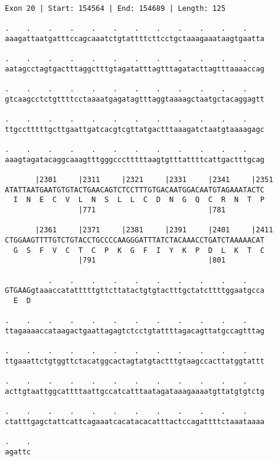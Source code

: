 \documentclass{article}
\begin{document}
\begin{Verbatim}[fontfamily=courier]
Exon 20 | Start: 154564 | End: 154689 | Length: 125

.    .    .    .    .    .    .    .    .    .    .    .    
aaagattaatgatttccagcaaatctgtattttcttcctgctaaagaaataagtgaatta

.    .    .    .    .    .    .    .    .    .    .    .    
aatagcctagtgactttaggctttgtagatatttagtttagatacttagtttaaaaccag

.    .    .    .    .    .    .    .    .    .    .    .    
gtcaagcctctgttttcctaaaatgagatagtttaggtaaaagctaatgctacaggagtt

.    .    .    .    .    .    .    .    .    .    .    .    
ttgcctttttgcttgaattgatcacgtcgttatgactttaaagatctaatgtaaaagagc

.    .    .    .    .    .    .    .    .    .    .    .    
aaagtagatacaggcaaagtttgggccctttttaagtgtttattttcattgactttgcag

       |2301     |2311     |2321     |2331     |2341     |2351
ATATTAATGAATGTGTACTGAACAGTCTCCTTTGTGACAATGGACAATGTAGAAATACTC
  I  N  E  C  V  L  N  S  L  L  C  D  N  G  Q  C  R  N  T  P
                 |771                          |781         

       |2361     |2371     |2381     |2391     |2401     |2411
CTGGAAGTTTTGTCTGTACCTGCCCCAAGGGATTTATCTACAAACCTGATCTAAAAACAT
  G  S  F  V  C  T  C  P  K  G  F  I  Y  K  P  D  L  K  T  C
                 |791                          |801         

          .    .    .    .    .    .    .    .    .    .    
GTGAAGgtaaaccatatttttgttcttatactgtgtactttgctatcttttggaatgcca
  E  D                                                      

.    .    .    .    .    .    .    .    .    .    .    .    
ttagaaaaccataagactgaattagagtctcctgtattttagacagttatgccagtttag

.    .    .    .    .    .    .    .    .    .    .    .    
ttgaaattctgtggttctacatggcactagtatgtactttgtaagccacttatggtattt

.    .    .    .    .    .    .    .    .    .    .    .    
acttgtaattggcattttaattgccatcatttaatagataaagaaaatgttatgtgtctg

.    .    .    .    .    .    .    .    .    .    .    .    
ctatttgagctattcattcagaaatcacatacacatttactccagattttctaaataaaa

.    .
agattc
\end{Verbatim}
\newpage
\end{document}
